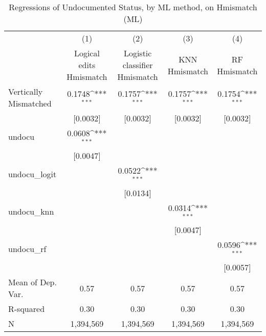 \begin{table}[htbp]\centering
\def\sym#1{\ifmmode^{#1}\else\(^{#1}\)\fi}
\caption{Regressions of Undocumented Status, by ML method, on Hmismatch (ML)}
\begin{tabular}{l*{4}{c}}
\toprule
                    &\multicolumn{1}{c}{(1)}         &\multicolumn{1}{c}{(2)}         &\multicolumn{1}{c}{(3)}         &\multicolumn{1}{c}{(4)}         \\
                    &Logical edits Hmismatch         &Logistic classifier Hmismatch         &KNN Hmismatch         &RF Hmismatch         \\
\midrule
Vertically Mismatched&      0.1748\sym{***}&      0.1757\sym{***}&      0.1757\sym{***}&      0.1754\sym{***}\\
                    &    [0.0032]         &    [0.0032]         &    [0.0032]         &    [0.0032]         \\
\addlinespace
undocu              &      0.0608\sym{***}&                     &                     &                     \\
                    &    [0.0047]         &                     &                     &                     \\
\addlinespace
undocu\_logit        &                     &      0.0522\sym{***}&                     &                     \\
                    &                     &    [0.0134]         &                     &                     \\
\addlinespace
undocu\_knn          &                     &                     &      0.0314\sym{***}&                     \\
                    &                     &                     &    [0.0047]         &                     \\
\addlinespace
undocu\_rf           &                     &                     &                     &      0.0596\sym{***}\\
                    &                     &                     &                     &    [0.0057]         \\
\midrule
Mean of Dep. Var.   &        0.57         &        0.57         &        0.57         &        0.57         \\
R-squared           &        0.30         &        0.30         &        0.30         &        0.30         \\
N                   &   1,394,569         &   1,394,569         &   1,394,569         &   1,394,569         \\

\end{tabular}
\end{table}
